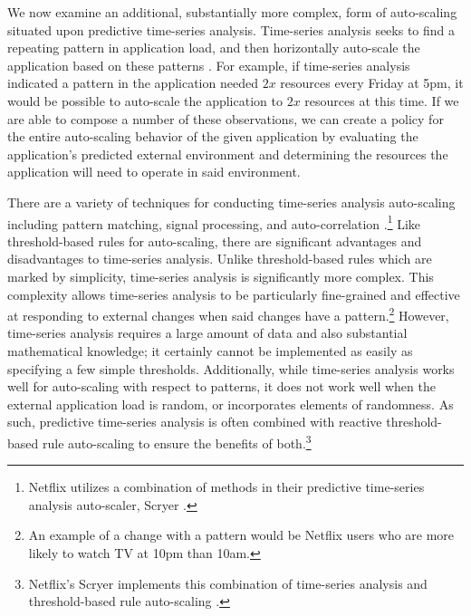 We now examine an additional, substantially more complex, form of auto-scaling
situated upon predictive time-series analysis. Time-series analysis seeks to
find a repeating pattern in application load, and then horizontally auto-scale
the application based on these
patterns
\cite{auto-scaling-techniques-for-elastic-applications-in-cloud-environments}.
For example, if time-series analysis indicated a pattern in the application needed
$2x$ resources every Friday at 5pm,
it would be possible to auto-scale the application to $2x$
resources at this time. If we are able to compose a number of these
observations, we can create a policy for the entire auto-scaling behavior of
the given application by evaluating the application's predicted external environment
and determining the resources the application will need to operate in said
environment.

There are a variety of techniques for conducting time-series analysis
auto-scaling including pattern matching, signal processing, and
auto-correlation
\cite{auto-scaling-techniques-for-elastic-applications-in-cloud-environments}.\footnote{Netflix utilizes a combination of methods in
their predictive time-series analysis auto-scaler,
Scryer \cite{netflix-scryer-part-ii}.}
Like threshold-based rules for auto-scaling, there are significant
advantages and disadvantages to time-series analysis. Unlike threshold-based
rules which are marked by simplicity, time-series analysis is significantly more
complex. This complexity allows time-series analysis to be particularly 
fine-grained and effective
at responding to external changes when said changes have a pattern.\footnote{An
example of a change with a pattern would be Netflix users who are more likely to
watch TV at 10pm than 10am.} However, time-series analysis requires a
large amount of data and also substantial mathematical
knowledge; it certainly cannot be implemented as easily as specifying a few
simple thresholds. Additionally, while time-series analysis works well for
auto-scaling with respect to patterns, it does not work well when the external
application load is random, or incorporates elements of randomness. As such,
predictive time-series analysis is
often combined with reactive threshold-based rule auto-scaling to ensure the benefits of
both.\footnote{Netflix's Scryer implements this combination of
time-series analysis and threshold-based rule
auto-scaling \cite{netflix-scryer-part-ii}.}


